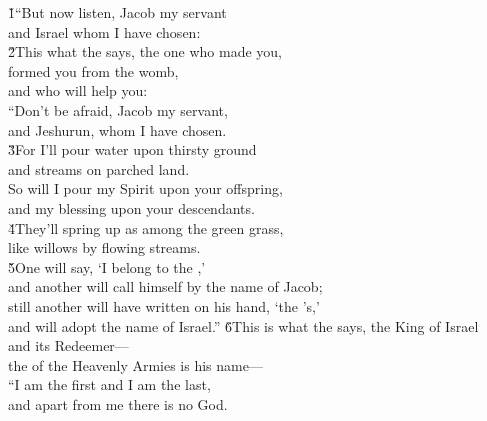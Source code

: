\begin{poetry}
\poeml {}
\v{1}``But now listen, Jacob my servant \\
\poemll    and Israel whom I have chosen: \\
\poeml \v{2}This what the  says, the one who made you, \\
\poemll    formed you from the womb, \\
\poemlll       and who will help you: \\
\poeml ``Don't be afraid, Jacob my servant, \\
\poemll    and Jeshurun, whom I have chosen. \\
\poeml \v{3}For I'll pour water upon thirsty ground \\
\poemll    and streams on parched land. \\
\poeml So will I pour my Spirit upon your offspring, \\
\poemll    and my blessing upon your descendants. \\
\poeml \v{4}They'll spring up as among the green grass, \\
\poemll    like willows by flowing streams. \\
\poeml \v{5}One will say, `I belong to the ,' \\
\poemll    and another will call himself by the name of Jacob; \\
\poeml still another will have written on his hand, `the 's,' \\
\poemll    and will adopt the name of Israel.''
\poeml \v{6}This is what the  says, the King of Israel \\
\poemll    and its Redeemer--- \\
\poemlll       the  of the Heavenly Armies is his name--- \\
\poeml ``I am the first and I am the last, \\
\poemll    and apart from me there is no God. \\

\end{poetry}
